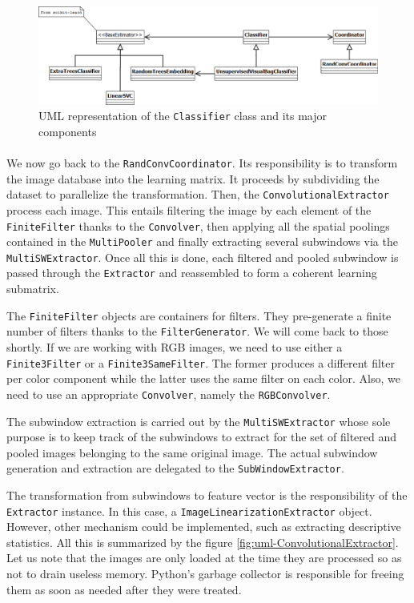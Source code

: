 \documentclass[a4paper]{report}
\begin{document}
		
		\begin{figure}
			\centering
				\includegraphics[width=1.00\textwidth]{images/uml-classifier.png}
			\caption{UML representation of the \texttt{Classifier} class and its major components}
			\label{fig:uml-classifier}
		\end{figure}
		
		
		\paragraph{}
		We now go back to the \texttt{RandConvCoordinator}. Its responsibility is to transform the image database into the learning matrix. It proceeds by subdividing the dataset to parallelize the transformation. Then, the \texttt{ConvolutionalExtractor} process each image. This entails filtering the image by each element of the \texttt{FiniteFilter} thanks to the \texttt{Convolver}, then applying all the spatial poolings contained in the \texttt{MultiPooler} and finally extracting several subwindows via the \texttt{MultiSWExtractor}. Once all this is done, each filtered and pooled subwindow is passed through the \texttt{Extractor} and reassembled to form a coherent learning submatrix.
		\par
		The \texttt{FiniteFilter} objects are containers for filters. They pre-generate a finite number of filters thanks to the \texttt{FilterGenerator}. We will come back to those shortly. If we are working with RGB images, we need to use either a \texttt{Finite3Filter} or a \texttt{Finite3SameFilter}. The former produces a different filter per color component while the latter uses the same filter on each color. Also, we need to use an appropriate \texttt{Convolver}, namely the \texttt{RGBConvolver}.
		\par
		The subwindow extraction is carried out by the \texttt{MultiSWExtractor} whose sole purpose is to keep track of the subwindows to extract for the set of filtered and pooled images belonging to the same original image. The actual subwindow generation and extraction are delegated to the \texttt{SubWindowExtractor}.
		\par
		The transformation from subwindows to feature vector is the responsibility of the \texttt{Extractor} instance. In this case, a \texttt{ImageLinearizationExtractor} object. However, other mechanism could be implemented, such as extracting descriptive statistics.
		All this is summarized by the figure \ref{fig:uml-ConvolutionalExtractor}. Let us note that the images are only loaded at the time they are processed so as not to drain useless memory. Python's garbage collector is responsible for freeing them as soon as needed after they were treated.
		
\end{document}
